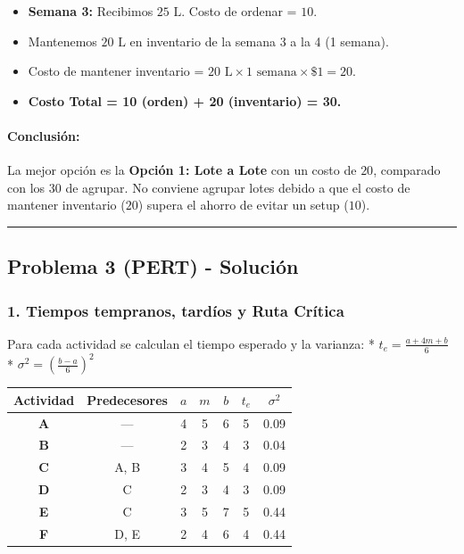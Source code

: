 \documentclass[
]{article}
\providecommand{\tightlist}{%
  \setlength{\itemsep}{0pt}\setlength{\parskip}{0pt}}
\begin{document}
\begin{itemize}
\tightlist
\item
  \textbf{Semana 3:} Recibimos \(25\text{ L}\). Costo de ordenar =
  \(10\).
\item
  Mantenemos \(20\text{ L}\) en inventario de la semana 3 a la 4 (1
  semana).
\item
  Costo de mantener inventario =
  \(20\text{ L} \times 1\text{ semana} \times \$1 = 20\).
\item
  \textbf{Costo Total = 10 (orden) + 20 (inventario) = 30.}
\end{itemize}

\hypertarget{conclusiuxf3n}{%
\paragraph{Conclusión:}\label{conclusiuxf3n}}

La mejor opción es la \textbf{Opción 1: Lote a Lote} con un costo de
\textbf{\(20\)}, comparado con los \(30\) de agrupar. No conviene
agrupar lotes debido a que el costo de mantener inventario (\(20\))
supera el ahorro de evitar un setup (\(10\)).

\begin{center}\rule{0.5\linewidth}{0.5pt}\end{center}

\hypertarget{problema-3-pert---soluciuxf3n}{%
\subsection{Problema 3 (PERT) -
Solución}\label{problema-3-pert---soluciuxf3n}}

\hypertarget{tiempos-tempranos-tarduxedos-y-ruta-cruxedtica}{%
\subsubsection{1. Tiempos tempranos, tardíos y Ruta
Crítica}\label{tiempos-tempranos-tarduxedos-y-ruta-cruxedtica}}

Para cada actividad se calculan el tiempo esperado y la varianza: *
\(t_e = \frac{a + 4m + b}{6}\) *
\(\sigma^2 = \left(\frac{b - a}{6}\right)^2\)

\begin{longtable}[]{@{}ccccccc@{}}
\toprule\noalign{}
Actividad & Predecesores & \(a\) & \(m\) & \(b\) & \(t_e\) &
\(\sigma^2\) \\
\midrule\noalign{}
\endhead
\bottomrule\noalign{}
\endlastfoot
\textbf{A} & --- & 4 & 5 & 6 & 5 & 0.09 \\
\textbf{B} & --- & 2 & 3 & 4 & 3 & 0.04 \\
\textbf{C} & A, B & 3 & 4 & 5 & 4 & 0.09 \\
\textbf{D} & C & 2 & 3 & 4 & 3 & 0.09 \\
\textbf{E} & C & 3 & 5 & 7 & 5 & 0.44 \\
\textbf{F} & D, E & 2 & 4 & 6 & 4 & 0.44 \\
\end{longtable}
\end{document}
